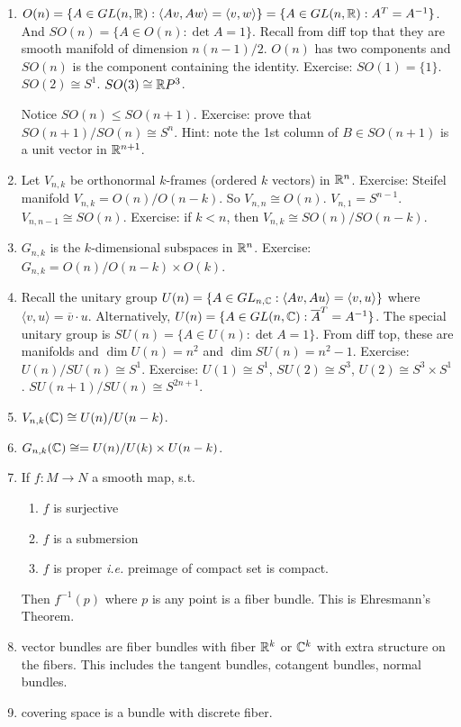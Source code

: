 \documentclass[12pt,class=article,crop=false]{standalone}
\begin{document}
\begin{eg}
\begin{enumerate}[label=(\arabic*)]
	\item $ O(n) = \{A \in GL(n, \mathbb{R}): \langle Av, Aw \rangle = \langle v,w \rangle \} = \{A \in GL(n,\mathbb{R}): A^{T} = A^{-1}\} $. And $ SO(n) = \{A \in O(n) : \det A = 1\} $. Recall from diff top that they are smooth manifold of dimension $ n(n-1) /2$.  $ O(n)$ has two components and  $ SO(n)$ is the component containing the identity. Exercise:  $ SO(1) = \{1\} $. $ SO(2) \cong S^{1}$. $ SO(3) \cong \mathbb{R} P^3$.

		Notice $ SO(n) \leq SO(n+1)$. Exercise: prove that  $ SO(n+1) / SO(n) \cong S^{n}$. Hint: note the 1st column of $ B \in SO(n+1)$ is a unit vector in $ \mathbb{R}^{n+1}$.
	\item Let $ V_{n,k}$ be orthonormal $ k$-frames (ordered $ k$ vectors) in  $ \mathbb{R}^{n}$. Exercise: Steifel manifold $ V_{n,k} = O(n) / O(n-k)$. So $ V_{n,n} \cong O(n)$. $ V_{n,1} = S^{n-1}$. $ V_{n,n-1} \cong SO(n)$. Exercise: if $ k<n$, then  $ V_{n,k} \cong SO(n) / SO(n-k)$.
	\item $ G_{n,k}$ is the $ k$-dimensional subspaces in  $ \mathbb{R}^{n}$. Exercise: $ G_{n,k} = O(n) / O(n-k) \times O(k)$.
	\item Recall the unitary group $ U(n) = \{A \in GL_{n, \mathbb{C}}: \langle Av,Au \rangle = \langle v,u \rangle\} $ where $ \langle v,u \rangle = \overline{v} \cdot u$. Alternatively, $ U(n) = \{A \in GL(n, \mathbb{C}) : \overline{A}^{T} = A^{-1}\} $. The special unitary group is $ SU(n) = \{A \in U(n): \det A =1\} $. From diff top, these are manifolds and $ \dim U(n) = n^2$ and $ \dim SU(n) = n^2-1$. Exercise: $ U(n) / SU(n) \cong S^{1}$. Exercise: $ U(1) \cong S^{1}$, $ SU(2) \cong S^3$, $ U(2) \cong S^3 \times S^{1}$. $ SU(n+1) / SU(n) \cong S^{2n+1}$. 
	\item $ V_{n,k}( \mathbb{C}) \cong U(n) / U(n-k)$.
	\item $ G_{n,k}( \mathbb{C}) \cong = U(n) / U(k) \times U(n-k)$.
	\item If $ f: M \to N$ a smooth map, s.t.\ 
		\begin{enumerate}[label=(\roman*)]
			\item $ f$ is surjective
			\item  $ f$ is a submersion
			\item  $ f$ is proper  \emph{i.e.} preimage of compact set is compact.
		\end{enumerate}
		Then $ f^{-1}(p)$ where $ p$ is any point is a fiber bundle. This is Ehresmann's Theorem.
	\item vector bundles are fiber bundles with fiber $ \mathbb{R}^{k}$ or $ \mathbb{C}^{k}$ with extra structure on the fibers. This includes the tangent bundles, cotangent bundles, normal bundles.
	\item covering space is a bundle with discrete fiber.
\end{enumerate}
\end{eg}
\end{document}
